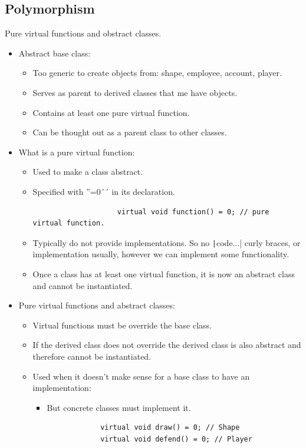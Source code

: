 \subsection{Polymorphism}
Pure virtual functions and obstract classes.
\begin{itemize}
    \item Abstract base class:
        \begin{itemize}
            \item Too generic to create objects from: shape, employee, account, player.
            \item Serves as parent to derived classes that me have objects.
            \item Contains at least one pure virtual function.
            \item Can be thought out as a parent class to other classes.
        \end{itemize}
    
    \item What is a pure virtual function:
        \begin{itemize}
            \item Used to make a class abstract.
            \item Specified with ''=0´´ in its declaration.
                \begin{verbatim}
                    virtual void function() = 0; // pure virtual function.
                \end{verbatim}
            
            \item Typically do not provide implementations. So no \texttt|{code...}| curly braces, or implementation usually, however we can implement some functionality.
            \item Once a class has at least one virtual function, it is now an abstract class and cannot be instantiated.
        \end{itemize}
    
    \item Pure virtual functions and abstract classes:
        \begin{itemize}
            \item Virtual functions must be override the base class.
            \item If the derived class does not override the derived class is also abstract and therefore cannot be instantiated.
            \item Used when it doesn't make sense for a base class to have an implementation:
                \begin{itemize}
                    \item But concrete classes must implement it.
                \end{itemize}
            \begin{verbatim}
                virtual void draw() = 0; // Shape
                virtual void defend() = 0; // Player
            \end{verbatim}
        \end{itemize}
    

\end{itemize}

